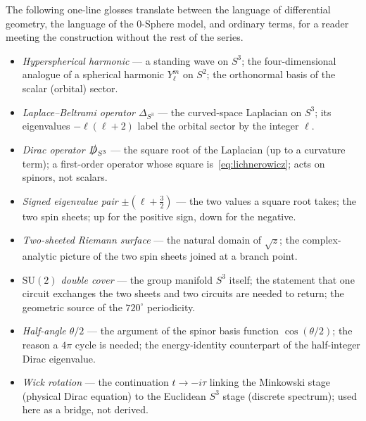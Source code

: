 \documentclass[%
 reprint, amsmath,amssymb, aps, prb, ]{revtex4-2}
\numberwithin{equation}{section}
\newcommand{\iphase}{\theta}  %
\newcommand{\Dslash}{\slashed{D}}
\begin{document}
The following one-line glosses translate between the language of differential geometry, the language of the 0-Sphere model, and ordinary terms, for a reader meeting the construction without the rest of the series.

\begin{itemize}[leftmargin=1.4em,itemsep=2pt]
\item \emph{Hyperspherical harmonic} --- a standing wave on $S^{3}$; the four-dimensional analogue of a spherical harmonic $Y_{\ell}^{m}$ on $S^{2}$; the orthonormal basis of the scalar (orbital) sector.
\item \emph{Laplace--Beltrami operator $\Delta_{S^{3}}$} --- the curved-space Laplacian on $S^{3}$; its eigenvalues $-\ell(\ell+2)$ label the orbital sector by the integer $\ell$.
\item \emph{Dirac operator $\Dslash_{S^{3}}$} --- the square root of the Laplacian (up to a curvature term); a first-order operator whose square is~\eqref{eq:lichnerowicz}; acts on spinors, not scalars.
\item \emph{Signed eigenvalue pair $\pm(\ell+\tfrac32)$} --- the two values a square root takes; the two spin sheets; up for the positive sign, down for the negative.
\item \emph{Two-sheeted Riemann surface} --- the natural domain of $\sqrt{z}$; the complex-analytic picture of the two spin sheets joined at a branch point.
\item \emph{$\mathrm{SU}(2)$ double cover} --- the group manifold $S^{3}$ itself; the statement that one circuit exchanges the two sheets and two circuits are needed to return; the geometric source of the $720^{\circ}$ periodicity.
\item \emph{Half-angle $\iphase/2$} --- the argument of the spinor basis function $\cos(\iphase/2)$; the reason a $4\pi$ cycle is needed; the energy-identity counterpart of the half-integer Dirac eigenvalue.
\item \emph{Wick rotation} --- the continuation $t\to-i\tau$ linking the Minkowski stage (physical Dirac equation) to the Euclidean $S^{3}$ stage (discrete spectrum); used here as a bridge, not derived.
\end{itemize}
\end{document}
